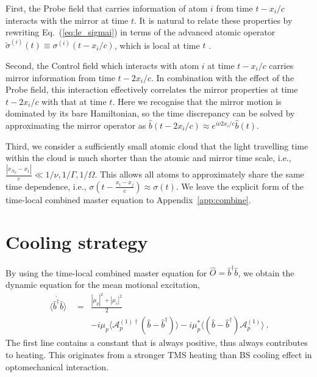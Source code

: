 \documentclass[aps, pra, reprint, amsmath, amssymb, groupedaddress, acknowledgments]{revtex4-1}
\begin{document}
First, the Probe field that carries information of atom $i$ from time $t-x_i/c$ interacts with the mirror at time $t$.  It is natural to relate these properties by rewriting Eq.~(\ref{eq:le_sigmai}) in terms of the advanced atomic operator $\tilde{\sigma}^{(i)}(t)\equiv \sigma^{(i)}(t-x_i/c)$, which is local at time $t$ \cite{book:Gardiner_Zoller}.  

Second, the Control field which interacts with atom $i$ at time $t- x_i/c$ carries mirror information from time $t-2 x_i/c$.  In combination with the effect of the Probe field, this interaction effectively correlates the mirror properties at time $t-2 x_i/c$ with that at time $t$.  Here we recognise that the mirror motion is dominated by its bare Hamiltonian, so the time discrepancy can be solved by approximating the mirror operator as $\hat{b}(t-2 x_i/c) \approx e^{i\nu 2 x_i/c}\hat{b}(t)$.

Third, we consider a sufficiently small atomic cloud that the light travelling time within the cloud is much shorter than the atomic and mirror time scale, i.e., $\frac{|x_{N_p}-x_1|}{c} \ll 1/\nu, 1/\Gamma, 1/\Omega$.  This allows all atoms to approximately share the same time dependence, i.e., $\sigma(t-\frac{x_i-x_j}{c})\approx \sigma(t)$.  We leave the explicit form of the time-local combined master equation to Appendix~\ref{app:combine}.




\section{Cooling strategy \label{sec:cooling}}

By using the time-local combined master equation for $\hat{O}= \hat{b}^\dag \hat{b}$, we obtain the dynamic equation for the mean motional excitation,  
\begin{eqnarray}
\dot{\langle \hat{b}^\dag\hat{b} \rangle}~~ &=&  \frac{|\mu_p|^2+|\mu_c|^2}{2} \nonumber \\
&&- i\mu_p \langle \mathcal{A}_p^{(1)\dag}(\hat{b}-\hat{b}^\dag)\rangle  -i \mu_p^\ast \langle(\hat{b}-\hat{b}^\dag) \mathcal{A}_p^{(1)}\rangle ~.\label{eq:expect_n}
\end{eqnarray}
The first line contains a constant that is always positive, thus always contributes to heating.  This originates from a stronger TMS heating than BS cooling effect in optomechanical interaction.  
\end{document}
